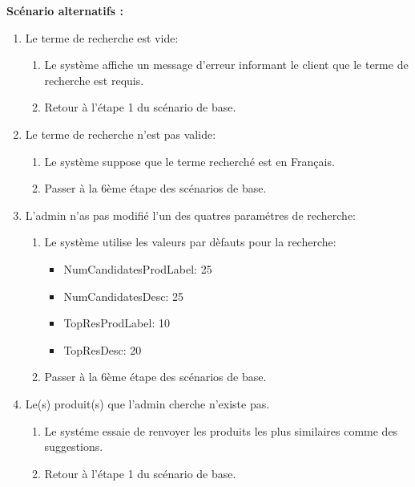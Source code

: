 \newpage
\textbf{Scénario alternatifs : }
\begin{enumerate}
	\item Le terme de recherche est vide:
	      \begin{enumerate}
		      \item Le système affiche un message d'erreur informant le client que le terme de recherche est requis.
		      \item Retour à l'étape 1 du scénario de base.
	      \end{enumerate}
	\item Le terme de recherche n'est pas valide:
	      \begin{enumerate}
		      \item Le système suppose que le terme recherché est en Français.
		      \item Passer à la 6ème étape des scénarios de base.
	      \end{enumerate}
	\item L'admin n'as pas modifié l'un des quatres paramétres de recherche:
	      \begin{enumerate}
		      \item Le système utilise les valeurs par dèfauts pour la recherche:
		      \begin{itemize}
						\item NumCandidatesProdLabel: 25
						\item NumCandidatesDesc: 25
						\item TopResProdLabel: 10
						\item TopResDesc: 20
					\end{itemize}
		      \item Passer à la 6ème étape des scénarios de base.
	      \end{enumerate}
	\item Le(s) produit(s) que l'admin cherche n'existe pas.
	      \begin{enumerate}
		      \item Le systéme essaie de renvoyer les produits les plus similaires comme des suggestions.
		      \item Retour à l'étape 1 du scénario de base.
	      \end{enumerate}
\end{enumerate}



